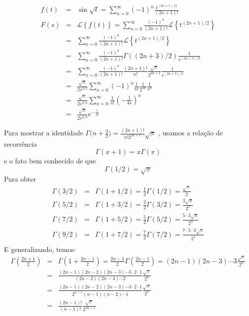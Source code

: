\begin{Answer}
 \begin{eqnarray*}
f(t)&=&\sin\sqrt{t}= \sum_{n=0}^{\infty}(-1)^n\frac{t^{(2n+1)/2}}{(2n+1)!}\\
F(s)&=&\mathcal{L}\left\{f(t)\right\}=\sum_{n=0}^{\infty}\frac{(-1)^n}{{(2n+1)!}}\mathcal{L}\left\{{t^{(2n+1)/2}}\right\}\\
&=&\sum_{n=0}^{\infty}\frac{(-1)^n}{{(2n+1)!}}\mathcal{L}\left\{{t^{(2n+1)/2}}\right\}\\
&=&\sum_{n=0}^{\infty}\frac{(-1)^n}{{(2n+1)!}}\Gamma\left((2n+3)/2\right)\frac{1}{s^{(2n+3)/2}}\\
&=&\sum_{n=0}^{\infty}\frac{(-1)^n}{{(2n+1)!}}\frac{(2n+1)!}{n!}\frac{\sqrt{\pi}}{2^{2n+1}}\frac{1}{s^{(2n+3)/2}}\\
&=&\frac{\sqrt{\pi}}{2s^{3/2}}\sum_{n=0}^{\infty}{(-1)^n}\frac{1}{n!}\frac{1}{2^{2n}}\frac{1}{s^{n}}\\
&=&\frac{\sqrt{\pi}}{2s^{3/2}}\sum_{n=0}^{\infty}\frac{1}{n!}{\left(-\frac{1}{4s}\right)^{n}}\\
&=&\frac{\sqrt{\pi}}{2s^{3/2}}e^{-\frac{1}{4s}}
\end{eqnarray*}

Para mostrar a identidade $\Gamma\bigg( n + \frac{3}{2} \bigg) = \frac{ (2n+1)!}{ n! 2^{2n+1}}\sqrt{\pi}$ , usamos a relação de recorrência
$$\Gamma(x+1)=x\Gamma(x)$$
e o fato bem conhecido  de que
$$\Gamma(1/2)=\sqrt{\pi}$$
Para obter
\begin{eqnarray*}
\Gamma(3/2)&=&\Gamma(1+1/2)=\frac{1}{2}\Gamma(1/2)=\frac{\sqrt{\pi}}{2}\\
\Gamma(5/2)&=&\Gamma(1+3/2)=\frac{3}{2}\Gamma(3/2)=\frac{3\sqrt{\pi}}{2^2}\\
\Gamma(7/2)&=&\Gamma(1+5/2)=\frac{5}{2}\Gamma(5/2)=\frac{5 \cdot 3\sqrt{\pi}}{2^3}\\
\Gamma(9/2)&=&\Gamma(1+7/2)=\frac{7}{2}\Gamma(7/2)=\frac{7\cdot 5 \cdot 3\sqrt{\pi}}{2^4}\\
\end{eqnarray*}
E generalizando, temos:
\begin{eqnarray*}
\Gamma\left(\frac{2n+1}{2}\right)&=&\Gamma\left(1+\frac{2n-1}{2}\right)=\frac{2n-1}{2}\Gamma\left(\frac{2n-1}{2}\right)={(2n-1)(2n-3)\cdots 3}\frac{\sqrt{\pi}}{2^{n}}\\
&=&\frac{(2n-1)(2n-2)(2n-3)\cdots 3\cdot 2 \cdot 1}{(2n-2)(2n-4)\cdots 2}\frac{\sqrt{\pi}}{2^{n}}\\
&=&\frac{(2n-1)(2n-2)(2n-3)\cdots 3\cdot 2 \cdot 1}{2^{n-1}(n-1)(n-2)\cdots 1}\frac{\sqrt{\pi}}{2^{n}}\\
&=&\frac{(2n-1)!}{(n-1)!}\frac{\sqrt{\pi}}{2^{2n-1}}
\end{eqnarray*}
\end{Answer}



